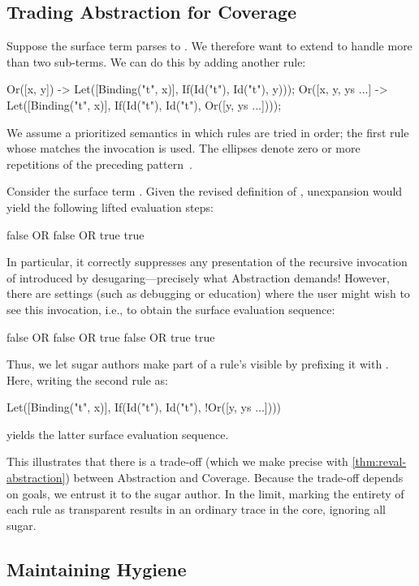 \subsection{Trading Abstraction for Coverage}
\label{sec:reval-trading}

Suppose the surface term  parses to
. We therefore want to extend 
to handle more than two sub-terms.  We can do this by adding another
rule:
\begin{Codes}
Or([x, y]) ->
  Let([Binding("t", x)],
      If(Id("t"), Id("t"), y)));
Or([x, y, ys ...] ->
  Let([Binding("t", x)],
      If(Id("t"), Id("t"), Or([y, ys ...])));
\end{Codes}
We assume a prioritized semantics in which rules are tried in
order; the first rule whose  matches the invocation is
used. The ellipses denote zero or more repetitions
of the preceding pattern~\cite{macro-by-example}.

Consider the surface term . 
Given the revised definition of , unexpansion would yield the
following lifted evaluation steps:
\begin{Codes}
    false OR false OR true
\SurfStep true
\end{Codes}
In particular, it correctly suppresses any presentation of the recursive
invocation of 
introduced by desugaring---precisely what Abstraction demands!
However, there are settings
(such as debugging or education) where the user might wish to see this
invocation, i.e., to obtain the surface evaluation sequence:
\begin{Codes}
    false OR false OR true
\SurfStep false OR true
\SurfStep true
\end{Codes}
Thus, we let sugar authors make part of a rule's 
visible by prefixing it with \Code{!}. Here, writing the second
 rule as:
\begin{Codes}
Let([Binding("t", x)],
    If(Id("t"), Id("t"), !Or([y, ys ...])))
\end{Codes}
yields the latter surface evaluation sequence.

This illustrates that there is a trade-off (which we make precise with
\cref{thm:reval-abstraction}) between Abstraction and Coverage.
Because the trade-off depends on
goals, we entrust it to the sugar author.  In the limit,
marking the entirety of each rule as transparent results in
an ordinary trace in the core, ignoring all sugar.

\subsection{Maintaining Hygiene}

